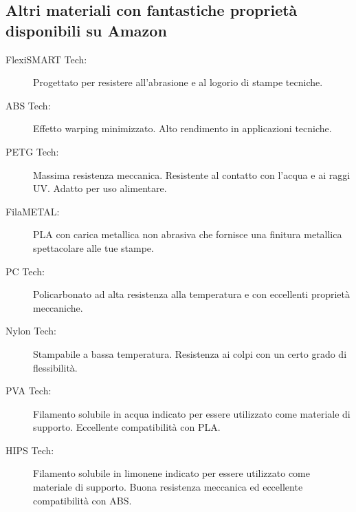 \documentclass[11pt,a4paper]{article}
\begin{document}
\subsection{Altri materiali con fantastiche proprietà disponibili su Amazon}
\begin{description}
\item[FlexiSMART Tech:] Progettato per resistere all'abrasione e al logorio di stampe tecniche.
\item[ABS Tech:] Effetto warping minimizzato. Alto rendimento in applicazioni tecniche.
\item[PETG Tech:] Massima resistenza meccanica. Resistente al contatto con l'acqua e ai raggi UV. Adatto per uso alimentare. 
\item[FilaMETAL:] PLA con carica metallica non abrasiva che fornisce una finitura metallica spettacolare alle tue stampe. 
\item[PC Tech:] Policarbonato ad alta resistenza alla temperatura e con eccellenti proprietà meccaniche.
\item[Nylon Tech:] Stampabile a bassa temperatura. Resistenza ai colpi con un certo grado di flessibilità.
\item[PVA Tech:] Filamento solubile in acqua indicato per essere utilizzato come materiale di supporto. Eccellente compatibilità con PLA.
\item[HIPS Tech:] Filamento solubile in limonene indicato per essere utilizzato come materiale di supporto. Buona resistenza meccanica ed eccellente compatibilità con ABS.
\end{description}

\end{document}
